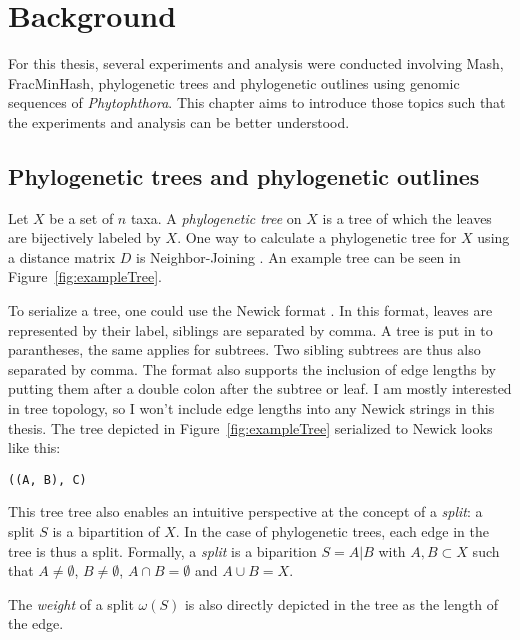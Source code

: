 
\chapter{Background}
  \label{sec:background}

For this thesis, several experiments and analysis were conducted involving Mash,
FracMinHash, phylogenetic trees and phylogenetic outlines using genomic
sequences of \textit{Phytophthora}. This chapter aims to introduce those topics
such that the experiments and analysis can be better understood.

\section{Phylogenetic trees and phylogenetic outlines}
Let $X$ be a set of $n$ taxa. A \textit{phylogenetic tree} on $X$ is a tree of
which the leaves are bijectively labeled by $X$. One way to calculate a
phylogenetic tree for $X$ using a distance matrix $D$ is Neighbor-Joining
\cite{saitouNeighborjoiningMethodNew1987}. An example tree can be seen in
Figure~\ref{fig:exampleTree}. 

To serialize a tree, one could use the Newick format
\cite{pavlopoulosReferenceGuideTree2010}. In this format, leaves are represented
by their label, siblings are separated by comma. A tree is put in to
parantheses, the same applies for subtrees. Two sibling subtrees are thus also
separated by comma. The format also supports the inclusion of edge lengths by
putting them after a double colon after the subtree or leaf. I am mostly
interested in tree topology, so I won't include edge lengths into any Newick
strings in this thesis. The tree depicted in Figure~\ref{fig:exampleTree}
serialized to Newick looks like this:

\texttt{((A, B), C)}

This tree tree also enables an intuitive
perspective at the concept of a \textit{split}: a split $S$ is a bipartition of
$X$. In the case of phylogenetic trees, each edge in the tree is thus a split.
Formally, a \textit{split} is a biparition $S=A|B$ with $A, B \subset X$
such that $A \neq \emptyset$, $B \neq \emptyset$, $A \cap B = \emptyset$ and $A
\cup B = X$.  

The \textit{weight} of a split $\omega(S)$ is also directly depicted in the tree
as the length of the edge. 

